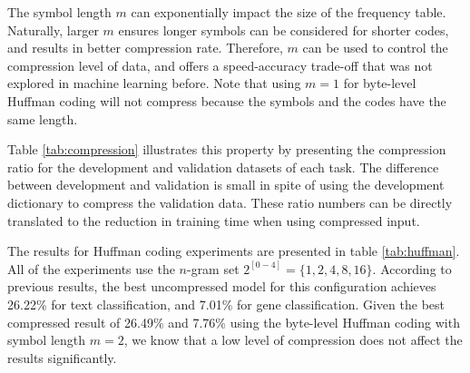 \documentclass[sigconf,review, anonymous]{acmart}
\begin{document}
The symbol length \(m\) can exponentially impact the size of the frequency table. Naturally, larger \(m\) ensures longer symbols can be considered for shorter codes, and results in better compression rate. Therefore, \(m\) can be used to control the compression level of data, and offers a speed-accuracy trade-off that was not explored in machine learning before. Note that using \(m=1\) for byte-level Huffman coding will not compress because the symbols and the codes have the same length.

Table \ref{tab:compression} illustrates this property by presenting the compression ratio for the development and validation datasets of each task. The difference between development and validation is small in spite of using the development dictionary to compress the validation data. These ratio numbers can be directly translated to the reduction in training time when using compressed input.

The results for Huffman coding experiments are presented in table \ref{tab:huffman}. All of the experiments use the \(n\)-gram set \(2^{[0-4]} = \{1,2,4,8,16\}\). According to previous results, the best uncompressed model for this configuration achieves 26.22\% for text classification, and 7.01\% for gene classification. Given the best compressed result of 26.49\% and 7.76\% using the byte-level Huffman coding with symbol length \(m=2\), we know that a low level of compression does not affect the results significantly.
\end{document}
